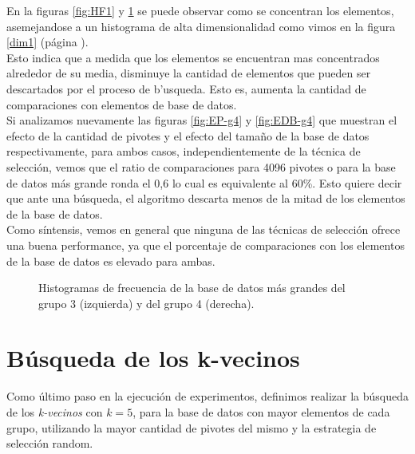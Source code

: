 En la figuras \ref{fig:HF1} y \ref{fig:HF2} se puede observar como se concentran los elementos, asemejandose a un histograma de alta dimensionalidad como vimos en la figura \ref{dim1} (p\'agina \pageref{dim1}).\\

Esto indica que a medida que los elementos se encuentran mas concentrados alrededor de su media, disminuye la cantidad de elementos que pueden ser descartados por el proceso de b'usqueda. Esto es, aumenta la cantidad de comparaciones con elementos de base de datos.\\

Si analizamos nuevamente las figuras \ref{fig:EP-g4} y \ref{fig:EDB-g4} que muestran el efecto de la cantidad de pivotes y el efecto del tama\~no de la base de datos respectivamente, para ambos casos, independientemente de la t\'ecnica de selecci\'on, vemos que el ratio de comparaciones para 4096 pivotes o para la base de datos m\'as grande ronda el 0,6 lo cual es equivalente al 60\%. Esto quiere decir que ante una b\'usqueda, el algoritmo descarta menos de la mitad de los elementos de la base de datos.\\

Como s\'intensis, vemos en general que ninguna de las t\'ecnicas de selecci\'on ofrece una buena performance, ya que el porcentaje de comparaciones con los elementos de la base de datos es elevado para ambas.\\

\begin{figure}[tb]
\centering
{}
		\caption{\small Histogramas de frecuencia de la base de datos m\'as grandes del grupo 1 (izquierda) y del grupo 2 (derecha).}
		\label{fig:HF1}
		
	\caption{\small Histogramas de frecuencia de la base de datos m\'as grandes del grupo 3 (izquierda) y del grupo 4 (derecha).}
		\label{fig:HF2}
\end{figure}


\section{B\'usqueda de los k-vecinos}

Como \'ultimo paso en la ejecuci\'on de experimentos, definimos realizar la b\'usqueda de los \textit{k-vecinos} con $k=5$, para la base de datos con mayor elementos de cada grupo, utilizando la mayor cantidad de pivotes del mismo y la estrategia de selecci\'on random.\\

